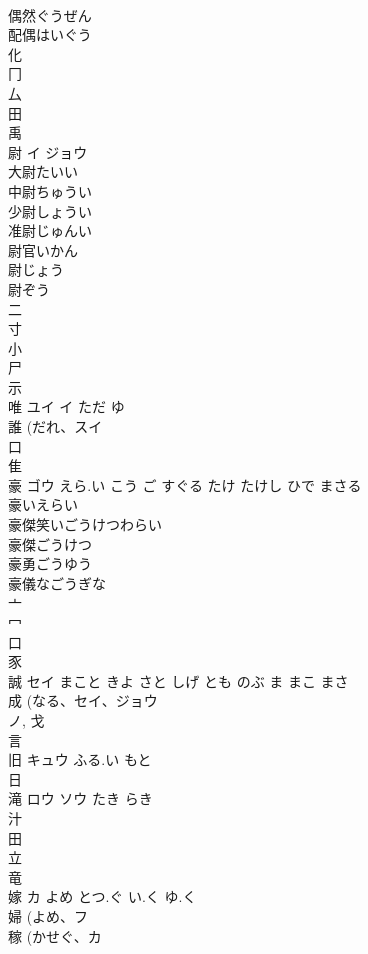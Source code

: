 \documentclass[8pt]{extreport}
\begin{document}
\begin{CJK}{UTF8}{min}
\\	偶然ぐうぜん
\\	配偶はいぐう
\\	化 
\\	冂 
\\	厶 
\\	田 
\\	禹 
\\	尉	イ ジョウ		
\\	大尉たいい
\\	中尉ちゅうい
\\	少尉しょうい
\\	准尉じゅんい
\\	尉官いかん
\\	尉じょう
\\	尉ぞう
\\	二 
\\	寸 
\\	小 
\\	尸 
\\	示 
\\	唯	ユイ イ	ただ ゆ	
\\	誰 (だれ、スイ 
\\	口 
\\	隹 
\\	豪	ゴウ	えら.い こう ご すぐる たけ たけし ひで まさる	
\\	豪いえらい 
\\	豪傑笑いごうけつわらい 
\\	豪傑ごうけつ 
\\	豪勇ごうゆう 
\\	豪儀なごうぎな 
\\	亠 
\\	冖 
\\	口 
\\	豕 
\\	誠	セイ	まこと きよ さと しげ とも のぶ ま まこ まさ	
\\	成 (なる、セイ、ジョウ 
\\	ノ, 戈 
\\	言 
\\	旧	キュウ	ふる.い もと	
\\	日 
\\	滝	ロウ ソウ	たき らき	
\\	汁 
\\	田 
\\	立 
\\	竜 
\\	嫁	カ	よめ とつ.ぐ い.く ゆ.く	
\\	婦 (よめ、フ 
\\	稼 (かせぐ、カ 

\end{CJK}
\end{document}
